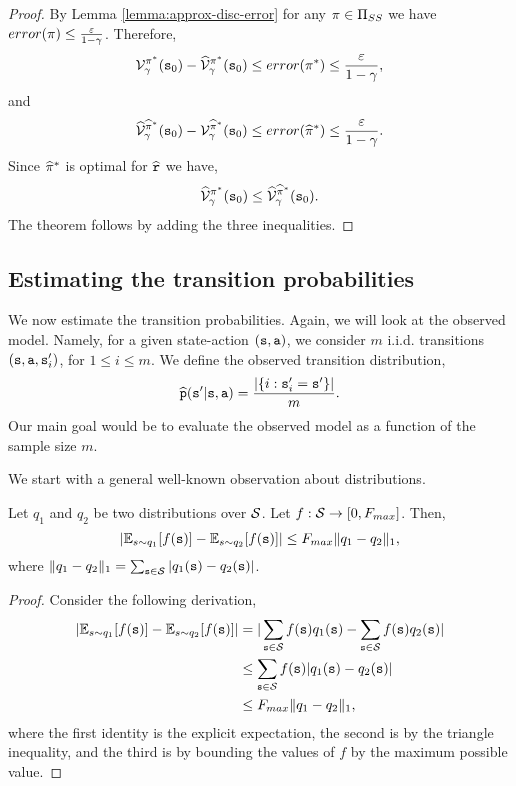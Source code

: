 \begin{proof}
By Lemma \ref{lemma:approx-disc-error} for any $\pi\in {\Pi
_{SS}}$ we have $error(\pi)\leq
\frac{\varepsilon}{1-\gamma}$. Therefore,
\[
\mathcal{V}^{\pi^*}_\gamma({\tt s}_0)-
\widehat{\mathcal{V}}^{\pi^*}_\gamma({\tt s}_0)\leq
error(\pi^*)\leq \frac{\varepsilon}{1-\gamma},
\]
and
\[
\widehat{\mathcal{V}}^{\widehat{\pi}^*}_\gamma({\tt s}_0)-
\mathcal{V}^{\widehat{\pi}^*}_\gamma({\tt s}_0)\leq
error(\widehat{\pi}^*)\leq \frac{\varepsilon}{1-\gamma} .
\]
Since $\widehat{\pi}^*$ is optimal for $\widehat{{\tt r}}$ we
have,
\[
\widehat{\mathcal{V}}^{\pi^*}_\gamma({\tt s}_0)\leq
\widehat{\mathcal{V}}^{\widehat{\pi}^*}_\gamma({\tt s}_0) .
\]
The theorem follows by adding the three inequalities.
\end{proof}

\subsection{Estimating the transition probabilities}

We now estimate the transition probabilities. Again, we will look at
the observed model. Namely, for a given state-action
$({\tt s},{\tt a})$, we consider $m$ i.i.d.
 transitions
$({\tt s},{\tt a},{\tt s}'_i)$, for $1\leq i\leq m$. We define the
observed transition distribution,
\[
\widehat{{\tt p}}({\tt s}'|{\tt s},{\tt a})=\frac{|\{i:{\tt s}'_i={\tt s}'\}|}{m}.
\]
Our main goal would be to evaluate the observed model as a function
of the sample size $m$.


We start with a general well-known observation about distributions.

\begin{theorem}
\label{thm:dist-l1} Let $q_1$ and $q_2$ be two distributions over
$\mathcal{S}$. Let $f:\mathcal{S} \rightarrow [0,F_{max}]$. Then,
\[
|\mathbb{E}_{s\sim q_1}[f({\tt s})]- \mathbb{E}_{s\sim q_2}[f({\tt s})]|\leq F_{max}
\|q_1-q_2\|_1,
\]
where $\|q_1-q_2\|_1=\sum_{{\tt s} \in \mathcal{S}}
|q_1({\tt s})-q_2({\tt s})|$.
\end{theorem}

\begin{proof} Consider the following derivation,
\begin{align*} |\mathbb{E}_{s\sim q_1}[f({\tt s})]- \mathbb{E}_{s\sim q_2}[f({\tt s})]|
&=|\sum_{{\tt s} \in \mathcal{S}} f({\tt s})q_1({\tt s}) - \sum_{{\tt s} \in \mathcal{S}} f({\tt s})q_2({\tt s})| \\
&\leq \sum_{{\tt s} \in \mathcal{S}} f({\tt s})|q_1({\tt s}) - q_2({\tt s})|\\
 &\leq F_{max} \|q_1-q_2\|_1,
\end{align*}
where the first identity is the explicit expectation, the second is by the triangle inequality, and the third is by bounding the values of $f$ by the maximum possible value.
\end{proof}


